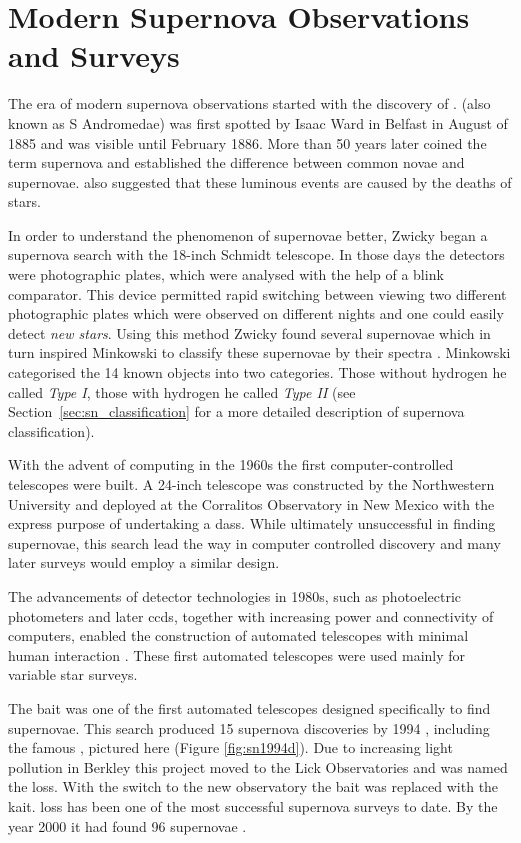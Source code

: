 \section{Modern Supernova Observations and Surveys}
\label{sec:surveys}

The era of modern supernova observations started with the discovery of .  (also known as S Andromedae) was first spotted by Isaac Ward in Belfast in August of 1885 \citep{1885AN....112..360H} and was visible until February 1886. 
More than 50 years later \citet{1934PNAS...20..254B} coined the term supernova and established the difference between common novae and supernovae. \citet{1934PNAS...20..254B} also suggested that these luminous events are caused by the deaths of stars. 

In order to understand the phenomenon of supernovae better, Zwicky began a supernova search with the 18-inch Schmidt telescope. In those days the detectors were photographic plates, which were analysed with the help of a blink comparator. This device permitted rapid switching between viewing two different photographic plates which were observed on different nights and one could easily detect \textit{new stars}. Using this method Zwicky found several supernovae which in turn inspired Minkowski to classify these supernovae by their spectra \citep{1941PASP...53..224M}. 
Minkowski categorised the 14 known objects into two categories. Those without hydrogen he called \emph{Type I}, those with hydrogen he called \emph{Type II} (see Section~\ref{sec:sn_classification} for a more detailed description of supernova classification).

With the advent of computing in the 1960s the first computer-controlled telescopes were built. A 24-inch telescope was constructed by the Northwestern University and deployed at the Corralitos Observatory in New Mexico with the express purpose of undertaking a \gls{dass}. While ultimately unsuccessful in finding supernovae, this search lead the way in computer controlled discovery and many later surveys would employ a similar design.

The advancements of detector technologies in 1980s, such as photoelectric photometers and later \glspl{ccd}, together with increasing power and connectivity of computers, enabled the construction of automated telescopes with minimal human interaction \citep[e.g.][]{1986IAUS..118...47G}. These first automated telescopes were used mainly for variable star surveys. 

The \gls{bait} was one of the first automated telescopes designed specifically to find supernovae. This search produced 15 supernova discoveries by 1994 \citep{1994AAS...185.7905V}, including the famous , pictured here (Figure \ref{fig:sn1994d}). Due to increasing light pollution in Berkley this project moved to the Lick Observatories and was named the \gls{loss}. With the switch to the new observatory the \gls{bait} was replaced with the \gls{kait}. \gls{loss} has been one of the most successful supernova surveys to date. By the year 2000 it had found 96 supernovae \citep{2001ASPC..246..121F}. 

